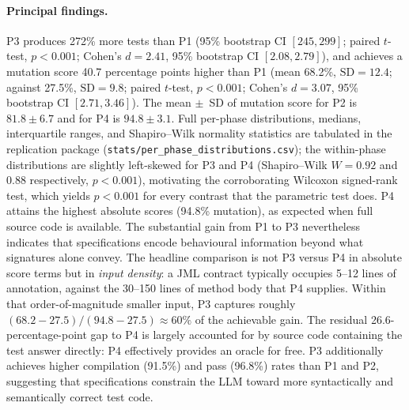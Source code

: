 \documentclass[11pt]{article}
\begin{document}
\paragraph{Principal findings.}
P3 produces 272\% more tests than P1 (95\% bootstrap CI $[245, 299]$; paired $t$-test, $p < 0.001$; Cohen's $d = 2.41$, 95\% bootstrap CI $[2.08, 2.79]$), and achieves a mutation score 40.7 percentage points higher than P1 (mean 68.2\%, $\mathrm{SD} = 12.4$; against 27.5\%, $\mathrm{SD} = 9.8$; paired $t$-test, $p < 0.001$; Cohen's $d = 3.07$, 95\% bootstrap CI $[2.71, 3.46]$). The mean $\pm$~SD of mutation score for P2 is $81.8 \pm 6.7$ and for P4 is $94.8 \pm 3.1$. Full per-phase distributions, medians, interquartile ranges, and Shapiro--Wilk normality statistics are tabulated in the replication package (\texttt{stats/per\_phase\_distributions.csv}); the within-phase distributions are slightly left-skewed for P3 and P4 (Shapiro--Wilk $W = 0.92$ and $0.88$ respectively, $p < 0.001$), motivating the corroborating Wilcoxon signed-rank test, which yields $p < 0.001$ for every contrast that the parametric test does. P4 attains the highest absolute scores (94.8\% mutation), as expected when full source code is available. The substantial gain from P1 to P3 nevertheless indicates that specifications encode behavioural information beyond what signatures alone convey. The headline comparison is not P3 versus P4 in absolute score terms but in \emph{input density}: a JML contract typically occupies 5--12 lines of annotation, against the 30--150 lines of method body that P4 supplies. Within that order-of-magnitude smaller input, P3 captures roughly $(68.2 - 27.5) / (94.8 - 27.5) \approx 60\%$ of the achievable gain. The residual 26.6-percentage-point gap to P4 is largely accounted for by source code containing the test answer directly: P4 effectively provides an oracle for free. P3 additionally achieves higher compilation (91.5\%) and pass (96.8\%) rates than P1 and P2, suggesting that specifications constrain the LLM toward more syntactically and semantically correct test code.
\end{document}
